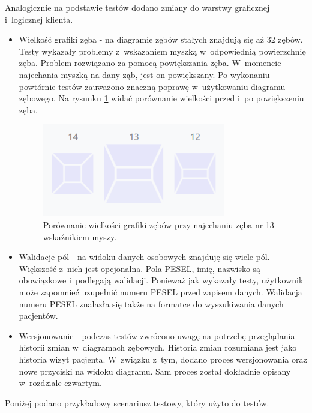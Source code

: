 Analogicznie na podstawie testów dodano zmiany do warstwy graficznej i~logicznej klienta.

\begin{itemize}
    \item Wielkość grafiki zęba - na diagramie zębów stałych znajdują się aż 32 zębów. Testy wykazały problemy z~wskazaniem myszką w~odpowiednią powierzchnię zęba. Problem rozwiązano za pomocą powiększania zęba. W~momencie najechania myszką na dany ząb, jest on powiększany. Po wykonaniu powtórnie testów zauważono znaczną poprawę w~użytkowaniu diagramu zębowego. Na rysunku \ref{fig:zabPowiekszenie} widać porównanie wielkości przed i~po powiększeniu zęba.
    \begin{figure}[ht!]
    \centering\includegraphics[width=80mm,scale=1.5]{figures/zabPowiekszony.PNG}
    \caption{Porównanie wielkości grafiki zębów przy najechaniu zęba nr 13 wskaźnikiem myszy.}
    \label{fig:zabPowiekszenie}
    \end{figure}
    \item Walidacje pól - na widoku danych osobowych znajduję się wiele pól. Większość z~nich jest opcjonalna. Pola PESEL, imię, nazwisko są obowiązkowe i~podlegają walidacji. Ponieważ jak wykazały testy, użytkownik może zapomnieć uzupełnić numeru PESEL przed zapisem danych. Walidacja numeru PESEL znalazła się także na formatce do wyszukiwania danych pacjentów.
    \item Wersjonowanie - podczas testów zwrócono uwagę na potrzebę przeglądania historii zmian w~diagramach zębowych. Historia zmian rozumiana jest jako historia wizyt pacjenta. W~związku z~tym, dodano proces wersjonowania oraz nowe przyciski na widoku diagramu. Sam proces został dokładnie opisany w~rozdziale czwartym.
\end{itemize}

Poniżej podano przykładowy scenariusz testowy, który użyto do testów.


